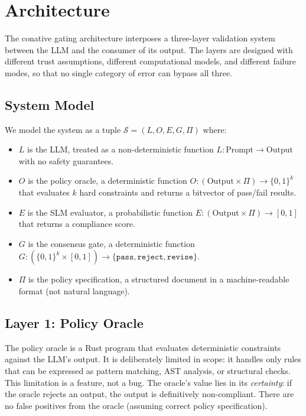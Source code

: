 \documentclass[11pt,a4paper]{article}
\begin{document}
\section{Architecture}
\label{sec:architecture}

The conative gating architecture interposes a three-layer validation
system between the LLM and the consumer of its output.  The layers
are designed with different trust assumptions, different computational
models, and different failure modes, so that no single category of
error can bypass all three.

\subsection{System Model}

We model the system as a tuple $\mathcal{S} = (L, O, E, G, \Pi)$ where:

\begin{itemize}
  \item $L$ is the LLM, treated as a non-deterministic function
        $L : \text{Prompt} \to \text{Output}$ with no safety guarantees.
  \item $O$ is the policy oracle, a deterministic function
        $O : (\text{Output} \times \Pi) \to \{0, 1\}^k$ that evaluates
        $k$ hard constraints and returns a bitvector of pass/fail results.
  \item $E$ is the SLM evaluator, a probabilistic function
        $E : (\text{Output} \times \Pi) \to [0,1]$ that returns a
        compliance score.
  \item $G$ is the consensus gate, a deterministic function
        $G : (\{0,1\}^k \times [0,1]) \to \{\texttt{pass}, \texttt{reject}, \texttt{revise}\}$.
  \item $\Pi$ is the policy specification, a structured document
        in a machine-readable format (not natural language).
\end{itemize}

\subsection{Layer 1: Policy Oracle}
\label{sec:oracle}

The policy oracle is a Rust program that evaluates deterministic
constraints against the LLM's output.  It is deliberately limited
in scope: it handles only rules that can be expressed as pattern
matching, AST analysis, or structural checks.  This limitation is
a feature, not a bug.  The oracle's value lies in its
\emph{certainty}: if the oracle rejects an output, the output is
definitively non-compliant.  There are no false positives from the
oracle (assuming correct policy specification).
\end{document}
